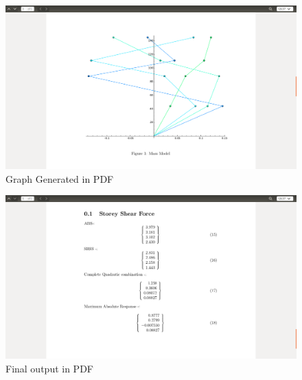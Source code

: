 \newpage
\begin{figure}[!h]
\centering \includegraphics[scale=0.31]{images/output/8.png}
\caption{Graph Generated in PDF}
\end{figure}
\begin{figure}[!h]
\centering \includegraphics[scale=0.31]{images/output/9.png}
\caption{Final output in PDF}
\end{figure}
\newpage

